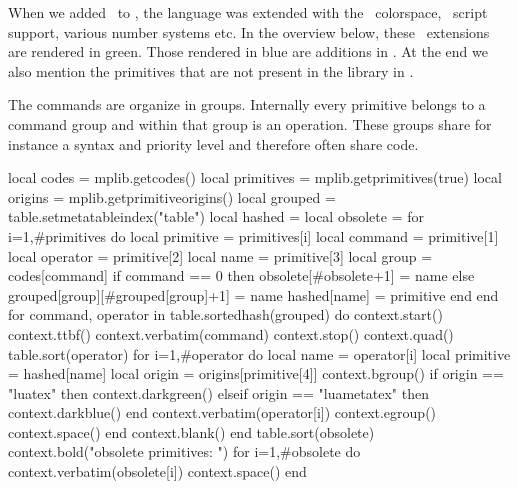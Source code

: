 \stopsection

\startsection[title={The language}]

When we added \METAPOST\ to \LUATEX, the language was extended with the \CMYK\
colorspace, \LUA\ script support, various number systems etc. In the overview
below, these \LUATEX\ extensions are rendered in green. Those rendered in blue
are additions in \LUAMETATEX. At the end we also mention the primitives that are
not present in the library in \LUAMETATEX.

The commands are organize in groups. Internally every primitive belongs to a
command group and within that group is an operation. These groups share for
instance a syntax and priority level and therefore often share code.

\startluacode
    local codes      = mplib.getcodes()
    local primitives = mplib.getprimitives(true)
    local origins    = mplib.getprimitiveorigins()
    local grouped    = table.setmetatableindex("table")
    local hashed     = { }
    local obsolete   = { }
    for i=1,#primitives do
        local primitive = primitives[i]
        local command   = primitive[1]
        local operator  = primitive[2]
        local name      = primitive[3]
        local group     = codes[command]
        if command == 0 then
            obsolete[#obsolete+1] = name
        else
            grouped[group][#grouped[group]+1] = name
            hashed[name] = primitive
        end
    end
    for command, operator in table.sortedhash(grouped) do
        context.start()
        context.ttbf()
        context.verbatim(command)
        context.stop()
        context.quad()
        table.sort(operator)
        for i=1,#operator do
            local name      = operator[i]
            local primitive = hashed[name]
            local origin    = origins[primitive[4]]
            context.bgroup()
            if origin == "luatex" then
                context.darkgreen()
            elseif origin == "luametatex" then
                context.darkblue()
            end
            context.verbatim(operator[i])
            context.egroup()
            context.space()
        end
        context.blank()
    end
    table.sort(obsolete)
    context.bold("obsolete primitives: ")
    for i=1,#obsolete do
        context.verbatim(obsolete[i])
        context.space()
    end
\stopluacode
\stopalign

\stopsection

\startsection[title={Instances}]

